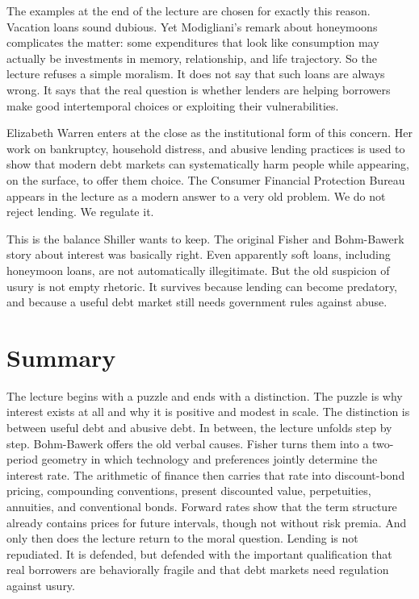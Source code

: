 The examples at the end of the lecture are chosen for exactly this reason. Vacation loans sound dubious. Yet Modigliani's remark about honeymoons complicates the matter: some expenditures that look like consumption may actually be investments in memory, relationship, and life trajectory. So the lecture refuses a simple moralism. It does not say that such loans are always wrong. It says that the real question is whether lenders are helping borrowers make good intertemporal choices or exploiting their vulnerabilities.

Elizabeth Warren enters at the close as the institutional form of this concern. Her work on bankruptcy, household distress, and abusive lending practices is used to show that modern debt markets can systematically harm people while appearing, on the surface, to offer them choice. The Consumer Financial Protection Bureau appears in the lecture as a modern answer to a very old problem. We do not reject lending. We regulate it.

This is the balance Shiller wants to keep. The original Fisher and Bohm-Bawerk story about interest was basically right. Even apparently soft loans, including honeymoon loans, are not automatically illegitimate. But the old suspicion of usury is not empty rhetoric. It survives because lending can become predatory, and because a useful debt market still needs government rules against abuse.

\section{Summary}

The lecture begins with a puzzle and ends with a distinction. The puzzle is why interest exists at all and why it is positive and modest in scale. The distinction is between useful debt and abusive debt. In between, the lecture unfolds step by step. Bohm-Bawerk offers the old verbal causes. Fisher turns them into a two-period geometry in which technology and preferences jointly determine the interest rate. The arithmetic of finance then carries that rate into discount-bond pricing, compounding conventions, present discounted value, perpetuities, annuities, and conventional bonds. Forward rates show that the term structure already contains prices for future intervals, though not without risk premia. And only then does the lecture return to the moral question. Lending is not repudiated. It is defended, but defended with the important qualification that real borrowers are behaviorally fragile and that debt markets need regulation against usury.